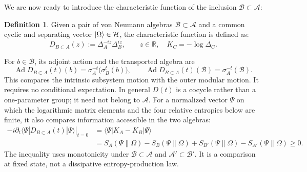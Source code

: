 \documentclass[a4paper,11pt]{article}
\theoremstyle{definition}
\newtheorem{definition}{Definition}[section]
\newcommand{\mA}{\mathcal{A}}
\newcommand{\mB}{\mathcal{B}}
\begin{document}
We are now ready to introduce the characteristic function of the inclusion $\mathcal{B}\subset\mathcal{A}$\cite{revolutionizing}:
\begin{definition}
    Given a pair of von Neumann algebras $\mathcal{B}\subset\mathcal{A}$ and a common cyclic and separating vector $\ket{\Omega}\in\mathcal{H}$, the characteristic function is defined as:
    \begin{equation}
        D_{B\subset A}(z):=\Delta_A^{-iz}\Delta_B^{iz},\qquad z\in\mathbb R,\quad K_C=-\log\Delta_C.
    \end{equation}
\end{definition}
For $b\in\mB$, its adjoint action and the transported algebra are
\begin{equation}\label{eq:characteristic-algebra-transport}
 \operatorname{Ad}D_{B\subset A}(t)(b)=\sigma_A^{-t}\bigl(\sigma_B^t(b)\bigr),
 \qquad \operatorname{Ad}D_{B\subset A}(t)(\mB)=\sigma_A^{-t}(\mB).
\end{equation}
This compares the intrinsic subsystem motion with the outer modular motion.
It requires no conditional expectation. In general $D(t)$ is a cocycle rather than
a one-parameter group; it need not belong to $\mA$.
For a normalized vector $\Psi$ on which the logarithmic matrix elements and the
four relative entropies below are finite, it also compares information accessible
in the two algebras:
\begin{align}
 -i\left.\partial_t\langle\Psi|D_{B\subset A}(t)|\Psi\rangle\right|_{t=0}
 &=\langle\Psi|K_A-K_B|\Psi\rangle\nonumber\\
 &=S_A(\Psi\|\Omega)-S_B(\Psi\|\Omega)
   +S_{B'}(\Psi\|\Omega)-S_{A'}(\Psi\|\Omega)\geq0.
 \label{eq:characteristic-entropy-comparison}
\end{align}
The inequality uses monotonicity under $\mB\subset\mA$ and $\mA'\subset\mB'$.
It is a comparison at fixed state, not a dissipative entropy-production law.
\end{document}

